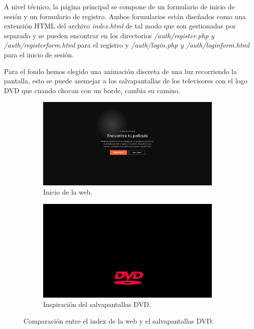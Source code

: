 \documentclass[a4paper, 12pt]{report}
\begin{document}
    A nivel técnico, la página principal se compone de un formulario de inicio de sesión y un formulario de registro. Ambos formularios están diseñados como una extensión HTML del archivo \textit{index.html} de tal modo que son gestionadas por separado y se pueden encontrar en los directorios \textit{/auth/register.php y /auth/registerform.html} para el registro y \textit{/auth/login.php y /auth/loginform.html} para el inicio de sesión.

    Para el fondo hemos elegido una animación discreta de una luz recorriendo la pantalla, esto se puede asemejar a los salvapantallas de los televisores con el logo DVD que cuando chocan con un borde, cambia su camino.

    \begin{figure}[h!]
        \centering
        \begin{subfigure}{0.45\textwidth}
            \includegraphics[width=\textwidth]{resources/img/index.png}
            \caption{Inicio de la web.}
            \label{fig:index}
        \end{subfigure}
        \hfill
        \begin{subfigure}{0.45\textwidth}
            \includegraphics[width=\textwidth]{resources/img/salvapantallasdvd.png}
            \caption{Inspiración del salvapantallas DVD.}
            \label{fig:savescreen}
        \end{subfigure}
        \caption{Comparación entre el index de la web y el salvapantallas DVD.}
        \label{fig:comparacion}
    \end{figure}
\end{document}
